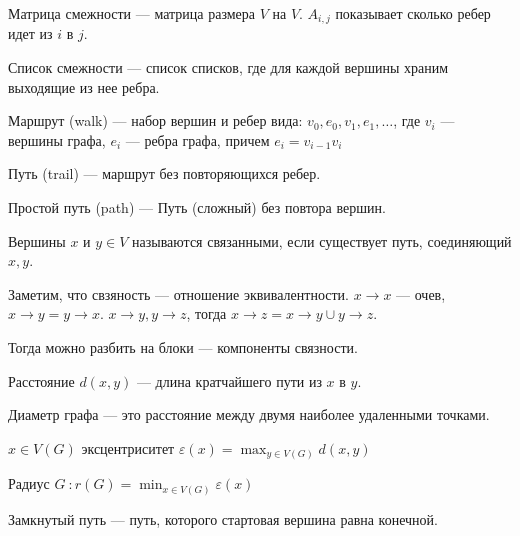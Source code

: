 \begin{definition}
    Матрица смежности --- матрица размера $V$ на $V$. $A_{i, j}$ показывает сколько ребер идет из $i$ в $j$.
\end{definition}
\begin{definition}
    Список смежности --- список списков, где для каждой вершины храним выходящие из нее ребра.
\end{definition}
\begin{definition}
    Маршрут (walk) --- набор вершин и ребер вида: $v_0, e_0, v_1, e_1, \ldots$, где $v_i$ --- вершины графа, $e_i$ --- ребра графа, причем $e_i = v_{i-1}v_i$
\end{definition}
\begin{definition}
    Путь (trail) --- маршрут без повторяющихся ребер.
\end{definition}
\begin{definition}
    Простой путь (path) --- Путь (сложный) без повтора вершин.
\end{definition}
\begin{definition}
    Вершины $x$ и  $y \in V$ называются связанными, если существует путь, соединяющий $x, y$. 
\end{definition}
\begin{remark}
    Заметим, что свзяность --- отношение эквивалентности. $x \to x$ --- очев, $x\to y = y \to x$. $x\to y, y\to z$, тогда $x\to z = x\to y \cup y\to z$.

    Тогда можно разбить на блоки --- компоненты связности.
\end{remark}
\begin{definition}
    Расстояние $d(x, y)$ --- длина кратчайшего пути из  $x$ в  $y$.
\end{definition}
\begin{definition}
    Диаметр графа --- это расстояние между двумя наиболее удаленными точками.
\end{definition}
\begin{definition}
	$x \in V(G)$ эксцентриситет  $\varepsilon(x) = \max_{y \in V(G)} d(x, y)$
\end{definition}
\begin{definition}
    Радиус $G\ : r(G) = \min_{x \in V(G)} \varepsilon(x)$
\end{definition}
\begin{definition}
    Замкнутый путь --- путь, которого стартовая вершина равна конечной.
\end{definition}
